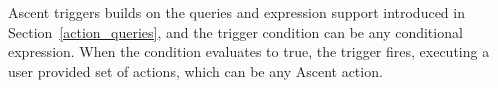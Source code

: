 Ascent triggers builds on the queries and expression support introduced in
Section~\ref{action_queries}, and the trigger condition can be any conditional
expression.
%
When the condition evaluates to true, the trigger fires, executing a user provided
set of actions, which can be any Ascent action.
%



